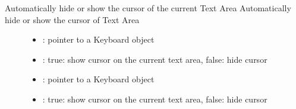\documentclass[letterpaper,10pt,english]{sphinxmanual}
\begin{document}

\begin{fulllineitems}
\label{\detokenize{object-types/kb:_CPPv423lv_kb_set_cursor_manageP8lv_obj_tb}}%
\pysigstartmultiline
{}\label{\detokenize{object-types/kb:lv__kb_8h_1a0cb4bef26d0cc26a549cfd9e303515d5}}%
\pysigstopmultiline
Automatically hide or show the cursor of the current Text Area 
Automatically hide or show the cursor of Text Area 
\begin{description}
\item[{}] \leavevmode\begin{itemize}
\item {} 
: pointer to a Keyboard object 

\item {} 
: true: show cursor on the current text area, false: hide cursor

\end{itemize}

\item[{}] \leavevmode\begin{itemize}
\item {} 
: pointer to a Keyboard object 

\item {} 
: true: show cursor on the current text area, false: hide cursor 

\end{itemize}

\end{description}


\end{fulllineitems}

\end{document}
